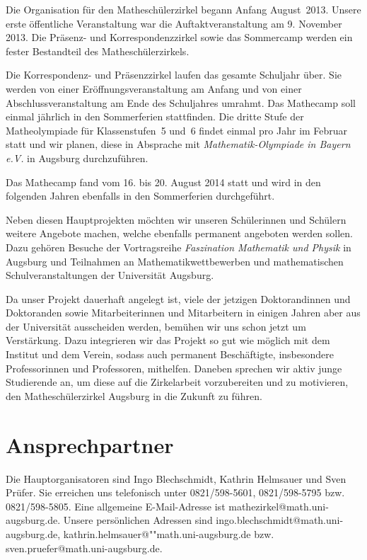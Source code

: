 \documentclass[12pt]{zettel}
\begin{document}
Die Organisation für den Matheschülerzirkel begann Anfang August~2013. Unsere
erste öffentliche Veranstaltung war die Auftaktveranstaltung am 9. November 2013.
Die Präsenz- und Korrespondenzzirkel sowie
das Sommercamp werden ein fester Bestandteil des Matheschülerzirkels.

Die Korrespondenz- und Präsenzzirkel laufen
das gesamte Schuljahr über. Sie werden von einer
Eröffnungsveranstaltung am Anfang und von einer
Abschlussveranstaltung am Ende des Schuljahres umrahmt. Das Mathecamp soll
einmal jährlich in den Sommerferien stattfinden. Die dritte Stufe der
Matheolympiade für Klassenstufen~5 und~6 findet einmal pro Jahr
im Februar statt und wir planen, diese in
Absprache mit \emph{Mathematik-Olympiade in Bayern e.V.} in Augsburg
durchzuführen.

Das Mathecamp fand vom 16. bis 20. August 2014 statt und wird in den folgenden Jahren ebenfalls in den Sommerferien durchgeführt.

Neben diesen Hauptprojekten möchten wir unseren Schülerinnen und
Schülern weitere Angebote machen, welche ebenfalls permanent angeboten
werden sollen. Dazu gehören Besuche der Vortragsreihe \emph{Faszination
Mathematik und Physik} in Augsburg und Teilnahmen
an Mathematikwettbewerben und mathematischen Schulveranstaltungen der Universität Augsburg.

Da unser Projekt dauerhaft angelegt ist, viele der jetzigen Doktorandinnen und Doktoranden sowie Mitarbeiterinnen und Mitarbeitern in einigen Jahren aber aus der Universität ausscheiden werden,
bemühen wir uns schon jetzt um Verstärkung.
Dazu integrieren wir das Projekt so gut wie möglich mit
dem Institut und dem Verein, sodass auch permanent Beschäftigte,
insbesondere Professorinnen und Professoren, mithelfen. Daneben sprechen wir
aktiv junge Studierende an, um diese auf die Zirkelarbeit
vorzubereiten und zu motivieren, den Matheschülerzirkel
Augsburg in die Zukunft zu führen.


\section{Ansprechpartner}

Die Hauptorganisatoren sind Ingo Blechschmidt, Kathrin Helmsauer und Sven
Prüfer. Sie erreichen uns telefonisch unter 0821/598-5601, 0821/598-5795 bzw.
0821/598-5805. Eine allgemeine E-Mail-Adresse ist
\textsf{mathezirkel@math.uni-augsburg.de}. Unsere persönlichen Adressen sind
\textsf{ingo.blechschmidt@math.uni-augsburg.de},
\textsf{kathrin.helmsauer@""math.uni-augsburg.de} bzw.
\textsf{sven.pruefer@math.uni-augsburg.de}.
\end{document}
